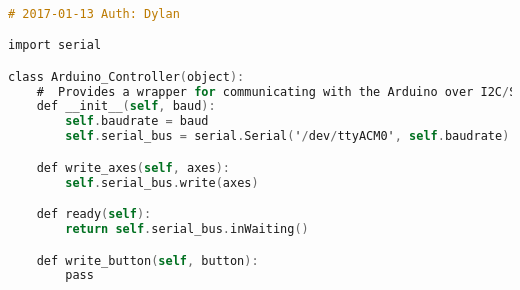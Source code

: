 \newpage

\begin{lstlisting}[language=C,caption={arduino.py Raspberry Pi Serial Communication Library},label={lst:arduino.py}]

# 2017-01-13 Auth: Dylan

import serial

class Arduino_Controller(object):
    #  Provides a wrapper for communicating with the Arduino over I2C/SMBUS.
    def __init__(self, baud):
        self.baudrate = baud
        self.serial_bus = serial.Serial('/dev/ttyACM0', self.baudrate)

    def write_axes(self, axes):
        self.serial_bus.write(axes)

    def ready(self):
        return self.serial_bus.inWaiting()

    def write_button(self, button):
        pass

\end{lstlisting}

\newpage

